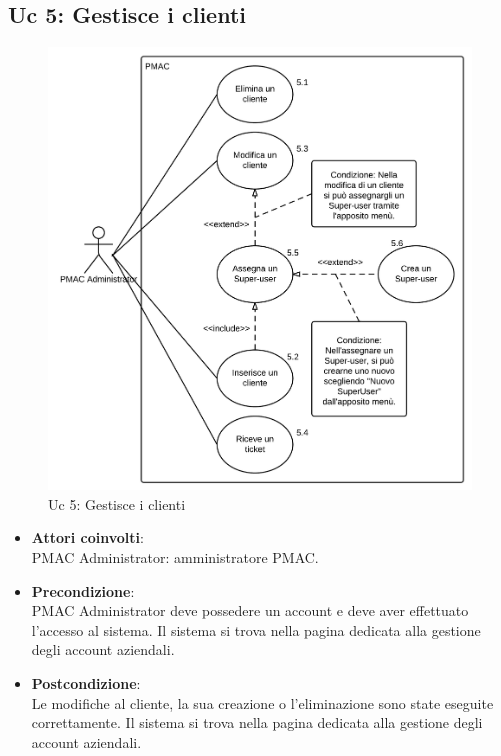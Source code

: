 {\subsection{Uc 5: Gestisce i clienti}
\begin{figure}[ht]
\centering
\caption{Uc 5: Gestisce i clienti}
\includegraphics[scale=0.9]{images/cap1/UseCase/Uc5} %
\end{figure}

\begin{itemize}
\item \textbf{Attori coinvolti}:\\
PMAC Administrator: amministratore PMAC.

\item \textbf{Precondizione}:\\
PMAC Administrator deve possedere un account e deve aver effettuato l'accesso al sistema. Il sistema si trova nella pagina dedicata alla gestione degli account aziendali.

\item \textbf{Postcondizione}:\\
Le modifiche al cliente, la sua creazione o l'eliminazione sono state eseguite correttamente. Il sistema si trova nella pagina dedicata alla gestione degli account aziendali.


\end{itemize}}
